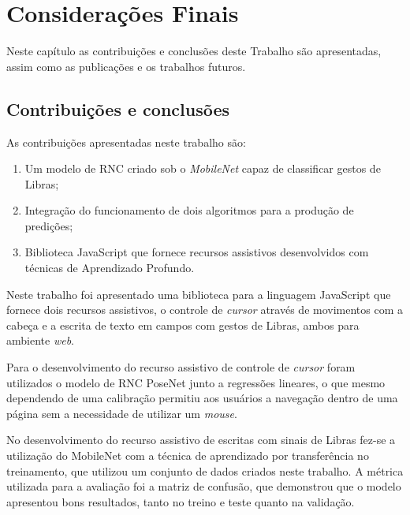 \newpage
\chapter{Considerações Finais}

\par Neste capítulo as contribuições e conclusões deste Trabalho são apresentadas, assim como as publicações e os trabalhos futuros.

\section{Contribuições e conclusões}

\par As contribuições apresentadas neste trabalho são:

\begin{enumerate}
    \item Um modelo de RNC criado sob o \textit{MobileNet} capaz de classificar gestos de Libras;
    \item Integração do funcionamento de dois algoritmos para a produção de predições; 
    \item Biblioteca JavaScript que fornece recursos assistivos desenvolvidos com técnicas de Aprendizado Profundo.
\end{enumerate}

\par Neste trabalho foi apresentado uma biblioteca para a linguagem JavaScript que fornece dois recursos assistivos, o controle de \textit{cursor} através de movimentos com a cabeça e a escrita de texto em campos com gestos de Libras, ambos para ambiente \textit{web}.

\par Para o desenvolvimento do recurso assistivo de controle de \textit{cursor} foram utilizados o modelo de RNC PoseNet junto a regressões lineares, o que mesmo dependendo de uma calibração permitiu aos usuários a navegação dentro de uma página sem a necessidade de utilizar um \textit{mouse}.

\par No desenvolvimento do recurso assistivo de escritas com sinais de Libras fez-se a utilização do MobileNet com a técnica de aprendizado por transferência no treinamento, que utilizou um conjunto de dados criados neste trabalho. A métrica utilizada para a avaliação foi a matriz de confusão, que demonstrou que o modelo apresentou bons resultados, tanto no treino e teste quanto na validação.

